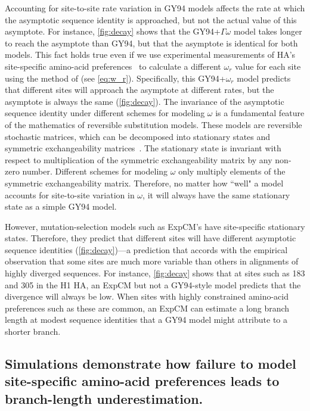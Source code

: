 \documentclass[11pt]{article}
\begin{document}
Accounting for site-to-site rate variation in GY94 models affects the rate at which the asymptotic sequence identity is approached, but not the actual value of this asymptote. 
For instance, \ref{fig:decay} shows that the GY94+$\Gamma\omega$ model takes longer to reach the asymptote than GY94, but that the asymptote is identical for both models. 
This fact holds true even if we use experimental measurements of HA's site-specific amino-acid preferences~\citep{doud2016accurate} to calculate a different $\omega_r$ value for each site using the method of \citet{spielman2015relationship} (see \ref{eq:w_r}).
Specifically, this GY94+$\omega_r$ model predicts that different sites will approach the asymptote at different rates, but the asymptote is always the same (\ref{fig:decay}).
The invariance of the asymptotic sequence identity under different schemes for modeling $\omega$ is a fundamental feature of the mathematics of reversible substitution models.
These models are reversible stochastic matrices, which can be decomposed into stationary states and symmetric exchangeability matrices~\citep{nielsen2006statistical}.
The stationary state is invariant with respect to multiplication of the symmetric exchangeability matrix by any non-zero number.
Different schemes for modeling $\omega$ only multiply elements of the symmetric exchangeability matrix.
Therefore, no matter how ``well" a model accounts for site-to-site variation in $\omega$, it will always have the same stationary state as a simple GY94 model. 

However, mutation-selection models such as ExpCM's have site-specific stationary states.
Therefore, they predict that different sites will have different asymptotic sequence identities (\ref{fig:decay})---a prediction that accords with the empirical observation that some sites are much more variable than others in alignments of highly diverged sequences.
For instance, \ref{fig:decay} shows that at sites such as 183 and 305 in the H1 HA, an ExpCM but not a GY94-style model predicts that the divergence will always be low. 
When sites with highly constrained amino-acid preferences such as these are common, an ExpCM can estimate a long branch length at modest sequence identities that a GY94 model might attribute to a shorter branch.


\subsection*{Simulations demonstrate how failure to model site-specific amino-acid preferences leads to branch-length underestimation.}
\end{document}
